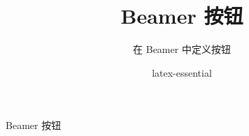 \documentclass{ctexbeamer}
\title{Beamer 按钮}
\subtitle{在 Beamer 中定义按钮}
\author{latex-essential}
\begin{document}
\begin{frame}
  \label{first}
  \titlepage
\end{frame}

\begin{frame}{Beamer 按钮}
  \hyperlink{first}{}
  \hyperlink{first}{}
  \hyperlink{first}{}  
  \hyperlink{first}{}
\end{frame}
\end{document}

